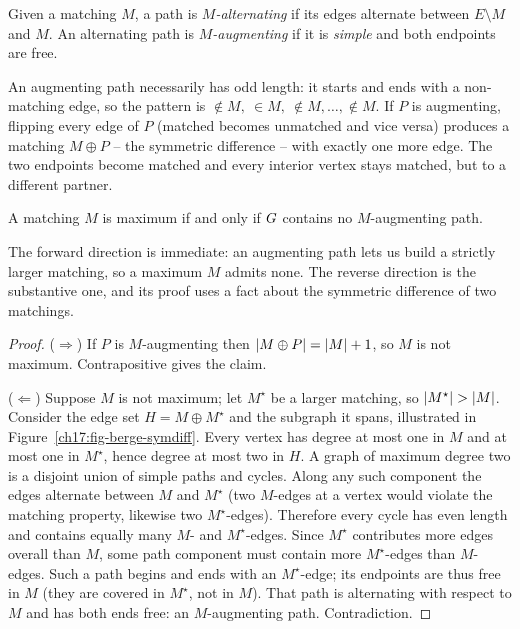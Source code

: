 \begin{definition}
\label{ch17:def-augpath}
Given a matching $M$, a path is \emph{$M$-alternating} if its edges alternate between $E\setminus M$
and $M$. An alternating path is \emph{$M$-augmenting} if it is \emph{simple} and both endpoints are
free.
\end{definition}

An augmenting path necessarily has odd length: it starts and ends with a non-matching edge, so the
pattern is $\notin M,\ \in M,\ \notin M,\dots,\notin M$. If $P$ is augmenting, flipping every edge of
$P$ (matched becomes unmatched and vice versa) produces a matching $M\oplus P$ -- the symmetric
difference -- with exactly one more edge. The two endpoints become matched and every interior vertex
stays matched, but to a different partner.

\begin{theorem}[Berge, 1957]
\label{ch17:thm-berge}
A matching $M$ is maximum if and only if $G$ contains no $M$-augmenting path.
\end{theorem}

\begin{whybox}
The forward direction is immediate: an augmenting path lets us build a strictly larger matching, so a
maximum $M$ admits none. The reverse direction is the substantive one, and its proof uses a fact
about the symmetric difference of two matchings.
\end{whybox}

\begin{proof}
($\Rightarrow$) If $P$ is $M$-augmenting then $\lvert M\oplus P\rvert=\lvert M\rvert+1$, so $M$ is not maximum.
Contrapositive gives the claim.

($\Leftarrow$) Suppose $M$ is not maximum; let $M^{\star}$ be a larger matching, so
$\lvert M^{\star}\rvert>\lvert M\rvert$. Consider the edge set $H=M\oplus M^{\star}$ and the subgraph it spans, illustrated in Figure~\ref{ch17:fig-berge-symdiff}.
Every vertex has degree at most one in $M$ and at most one in $M^{\star}$, hence degree at most two in
$H$. A graph of maximum degree two is a disjoint union of simple paths and cycles. Along any such
component the edges alternate between $M$ and $M^{\star}$ (two $M$-edges at a vertex would violate the
matching property, likewise two $M^{\star}$-edges). Therefore every cycle has even length and
contains equally many $M$- and $M^{\star}$-edges. Since $M^{\star}$ contributes more edges overall
than $M$, some path component must contain more $M^{\star}$-edges than $M$-edges. Such a path begins
and ends with an $M^{\star}$-edge; its endpoints are thus free in $M$ (they are covered in
$M^{\star}$, not in $M$). That path is alternating with respect to $M$ and has both ends free: an
$M$-augmenting path. Contradiction.
\end{proof}

